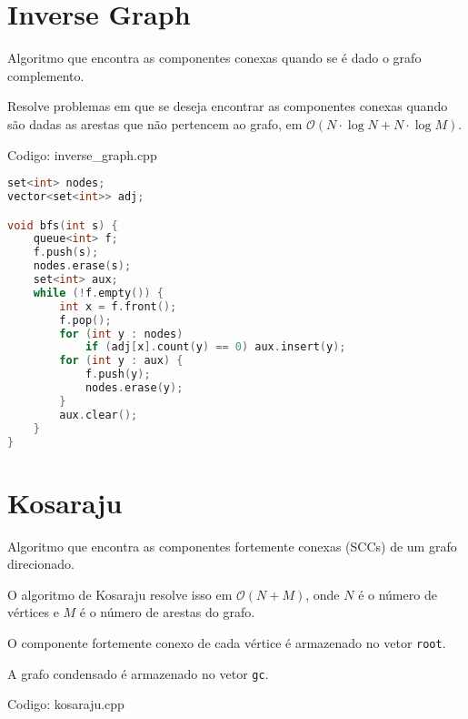 \documentclass[10pt, a4paper, oneside]{book}
\begin{document}
\section{Inverse Graph}


Algoritmo que encontra as componentes conexas quando se é dado o grafo complemento.



Resolve problemas em que se deseja encontrar as componentes conexas quando são dadas as arestas que não pertencem ao grafo, em $\mathcal{O}(N \cdot \log N + N \cdot \log M)$.
\hfill

Codigo: inverse\_graph.cpp

\begin{lstlisting}[language=C++]
set<int> nodes;
vector<set<int>> adj;

void bfs(int s) {
    queue<int> f;
    f.push(s);
    nodes.erase(s);
    set<int> aux;
    while (!f.empty()) {
        int x = f.front();
        f.pop();
        for (int y : nodes)
            if (adj[x].count(y) == 0) aux.insert(y);
        for (int y : aux) {
            f.push(y);
            nodes.erase(y);
        }
        aux.clear();
    }
}
\end{lstlisting}
\hfill

\section{Kosaraju}


Algoritmo que encontra as componentes fortemente conexas (SCCs) de um grafo direcionado.

O algoritmo de Kosaraju resolve isso em $\mathcal{O}(N + M)$, onde $N$ é o número de vértices e $M$ é o número de arestas do grafo.



O componente fortemente conexo de cada vértice é armazenado no vetor \texttt{root}.

A grafo condensado é armazenado no vetor \texttt{gc}.

\hfill

Codigo: kosaraju.cpp
\end{document}
